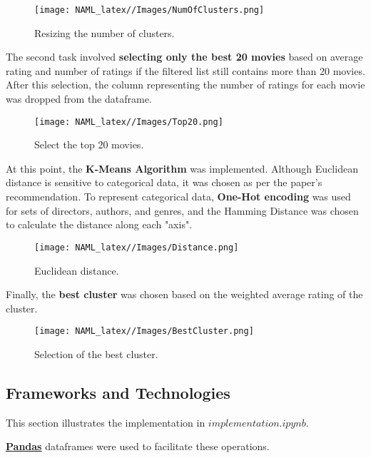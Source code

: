 \documentclass{Configuration_Files/Template}
\begin{document}
\begin{figure}[H]
    \centering
    \texttt{[image: NAML\_latex//Images/NumOfClusters.png]}
    \caption{Resizing the number of clusters.}
\end{figure}

The second task involved \textbf{selecting only the best 20 movies} based on average rating and number of ratings if the filtered list still contains more than 20 movies. After this selection, the column representing the number of ratings for each movie was dropped from the dataframe.\\

\begin{figure}[H]
    \centering
    \texttt{[image: NAML\_latex//Images/Top20.png]}
    \caption{Select the top 20 movies.}
\end{figure}

At this point, the \textbf{K-Means Algorithm} was implemented. Although Euclidean distance is sensitive to categorical data, it was chosen as per the paper's recommendation. To represent categorical data, \textbf{One-Hot encoding} was used for sets of directors, authors, and genres, and the Hamming Distance was chosen to calculate the distance along each "axis".\\

\begin{figure}[H]
    \centering
    \texttt{[image: NAML\_latex//Images/Distance.png]}
    \caption{Euclidean distance.}
\end{figure}

Finally, the \textbf{best cluster} was chosen based on the weighted average rating of the cluster.\\

\begin{figure}[H]
    \centering
    \texttt{[image: NAML\_latex//Images/BestCluster.png]}
    \caption{Selection of the best cluster.}
    \label{fig:enter-label}
\end{figure}

\subsection{Frameworks and Technologies}

This section illustrates the implementation in \(implementation.ipynb\).

\textbf{\href{https://pandas.pydata.org}{Pandas}} dataframes were used to facilitate these operations.
\end{document}

